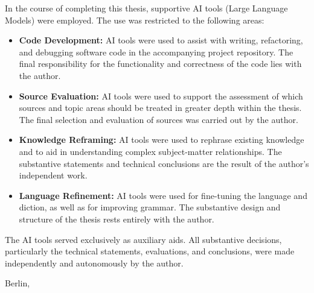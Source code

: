 

In the course of completing this thesis, supportive AI tools (Large Language Models) were employed.
The use was restricted to the following areas:

\begin{itemize}
    \item \textbf{Code Development:} AI tools were used to assist with writing, refactoring, 
          and debugging software code in the accompanying project repository. The final 
          responsibility for the functionality and correctness of the code lies with the author.
          
    \item \textbf{Source Evaluation:} AI tools were used to support the assessment of which 
          sources and topic areas should be treated in greater depth within the thesis. The 
          final selection and evaluation of sources was carried out by the author.
          
    \item \textbf{Knowledge Reframing:} AI tools were used to rephrase existing knowledge 
          and to aid in understanding complex subject-matter relationships. The substantive 
          statements and technical conclusions are the result of the author's independent work.
          
    \item \textbf{Language Refinement:} AI tools were used for fine-tuning the language and 
          diction, as well as for improving grammar. The substantive design and structure 
          of the thesis rests entirely with the author.
\end{itemize}

The AI tools served exclusively as auxiliary aids. All substantive decisions, 
particularly the technical statements, evaluations, and conclusions, were made 
independently and autonomously by the author.

\vskip 1cm

Berlin, \thedatum

\vskip 1.5cm

\theautor
